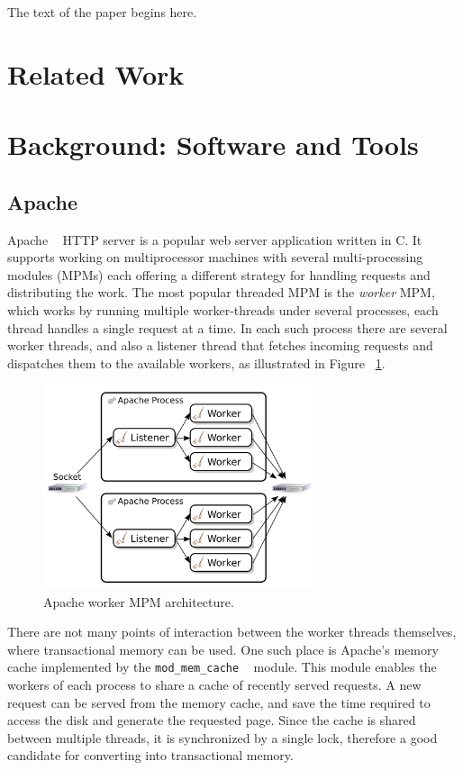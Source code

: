 \documentclass[preprint,natbib,11pt]{sigplanconf}
\begin{document}
The text of the paper begins here.
\section{Related Work}
\section{Background: Software and Tools}
\subsection{Apache}
Apache ~\cite{apache} HTTP server is a popular web server application written in
C. It supports working on multiprocessor machines with several multi-processing
modules (MPMs) each offering a different strategy for handling requests and
distributing the work. The most popular threaded MPM is the \emph{worker} MPM,
which works by running multiple worker-threads under several processes, each
thread handles a single request at a time. In each such process there are
several worker threads, and also a listener thread that fetches incoming
requests and dispatches them to the available workers, as illustrated in Figure
~\ref{fig:apache-worker-MPM}.

\begin{figure}
 \begin{center}
  \includegraphics[width=8cm]{Apache-Worker-MPM.png}
 \end{center}
 \caption{Apache worker MPM architecture.}
 \label{fig:apache-worker-MPM}
\end{figure}

There are not many points of interaction between the worker threads themselves,
where transactional memory can be used. One such place is Apache's memory cache
implemented by the {\tt mod\_mem\_cache} ~\cite{apache:mod_mem_cache} module. This
module enables the workers of each process to share a cache of recently served
requests. A new request can be served from the memory cache, and save the time
required to access the disk and generate the requested page. Since the cache is
shared between multiple threads, it is synchronized by a single lock, therefore
a good candidate for converting into transactional memory.
\end{document}
